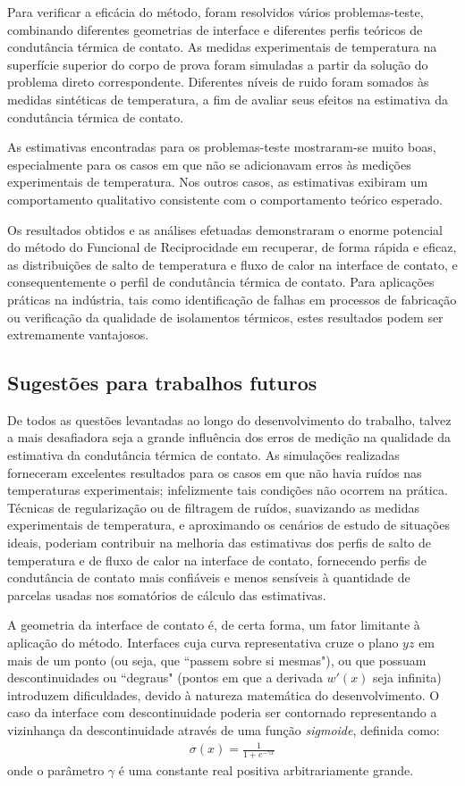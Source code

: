 Para verificar a eficácia do método, foram resolvidos vários problemas-teste, combinando diferentes geometrias de interface e diferentes perfis teóricos de condutância térmica de contato. As medidas experimentais de temperatura na superfície superior do corpo de prova foram simuladas a partir da solução do problema direto correspondente. Diferentes níveis de ruido foram somados às medidas sintéticas de temperatura, a fim de avaliar seus efeitos na estimativa da condutância térmica de contato.

As estimativas encontradas para os problemas-teste mostraram-se muito boas, especialmente para os casos em que não se adicionavam erros às medições experimentais de temperatura. Nos outros casos, as estimativas exibiram um comportamento qualitativo consistente com o comportamento teórico esperado.

Os resultados obtidos e as análises efetuadas demonstraram o enorme potencial do método do Funcional de Reciprocidade em recuperar, de forma rápida e eficaz, as distribuições de salto de temperatura e fluxo de calor na interface de contato, e consequentemente o perfil de condutância térmica de contato. Para aplicações práticas na indústria, tais como identificação de falhas em processos de fabricação ou verificação da qualidade de isolamentos térmicos, estes resultados podem ser extremamente vantajosos.


\subsection{Sugestões para trabalhos futuros}

De todos as questões levantadas ao longo do desenvolvimento do trabalho, talvez a mais desafiadora seja a grande influência dos erros de medição na qualidade da estimativa da condutância térmica de contato. As simulações realizadas forneceram excelentes resultados para os casos em que não havia ruídos nas temperaturas experimentais; infelizmente tais condições não ocorrem na prática. Técnicas de regularização ou de filtragem de ruídos, suavizando as medidas experimentais de temperatura, e aproximando os cenários de estudo de situações ideais, poderiam contribuir na melhoria das estimativas dos perfis de salto de temperatura e de fluxo de calor na interface de contato, fornecendo perfis de condutância de contato mais confiáveis e menos sensíveis à quantidade de parcelas usadas nos somatórios de cálculo das estimativas.

A geometria da interface de contato é, de certa forma, um fator limitante à aplicação do método. Interfaces cuja curva representativa cruze o plano $yz$ em mais de um ponto (ou seja, que ``passem sobre si mesmas"), ou que possuam descontinuidades ou ``degraus" (pontos em que a derivada $w'(x)$ seja infinita) introduzem dificuldades, devido à natureza matemática do desenvolvimento. O caso da interface com descontinuidade poderia ser contornado representando a vizinhança da descontinuidade através de uma função \textit{sigmoide}, definida como:
\begin{align}
\sigma(x) = \frac{1}{1 + e^{-\gamma x}}
\end{align}
onde o parâmetro $\gamma$ é uma constante real positiva arbitrariamente grande.

